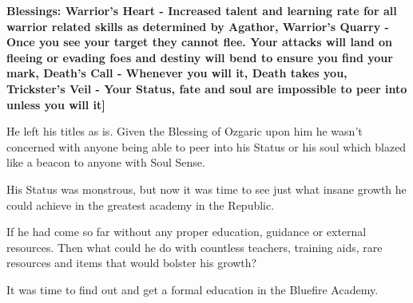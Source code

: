 \documentclass[a4paper,10pt]{book}
\begin{document}
\textbf{Blessings: Warrior’s Heart - Increased talent and learning rate for all warrior related skills as determined by Agathor, Warrior’s Quarry - Once you see your target they cannot flee. Your attacks will land on fleeing or evading foes and destiny will bend to ensure you find your mark, Death’s Call - Whenever you will it, Death takes you, Trickster’s Veil - Your Status, fate and soul are impossible to peer into unless you will it]}\par
He left his titles as is. Given the Blessing of Ozgaric upon him he wasn’t concerned with anyone being able to peer into his Status or his soul which blazed like a beacon to anyone with Soul Sense.\par
His Status was monstrous, but now it was time to see just what insane growth he could achieve in the greatest academy in the Republic.\par
If he had come so far without any proper education, guidance or external resources. Then what could he do with countless teachers, training aids, rare resources and items that would bolster his growth?\par
It was time to find out and get a formal education in the Bluefire Academy.\par
\end{document}
